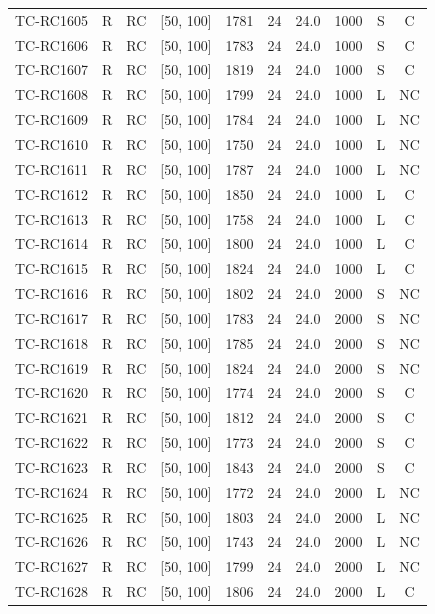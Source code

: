 \begin{longtable}{lccccccccc}
TC-RC1605 & R & RC & [50, 100] & 1781 & 24 & 24.0 & 1000 & S & C \\
TC-RC1606 & R & RC & [50, 100] & 1783 & 24 & 24.0 & 1000 & S & C \\
TC-RC1607 & R & RC & [50, 100] & 1819 & 24 & 24.0 & 1000 & S & C \\
TC-RC1608 & R & RC & [50, 100] & 1799 & 24 & 24.0 & 1000 & L & NC \\
TC-RC1609 & R & RC & [50, 100] & 1784 & 24 & 24.0 & 1000 & L & NC \\
TC-RC1610 & R & RC & [50, 100] & 1750 & 24 & 24.0 & 1000 & L & NC \\
TC-RC1611 & R & RC & [50, 100] & 1787 & 24 & 24.0 & 1000 & L & NC \\
TC-RC1612 & R & RC & [50, 100] & 1850 & 24 & 24.0 & 1000 & L & C \\
TC-RC1613 & R & RC & [50, 100] & 1758 & 24 & 24.0 & 1000 & L & C \\
TC-RC1614 & R & RC & [50, 100] & 1800 & 24 & 24.0 & 1000 & L & C \\
TC-RC1615 & R & RC & [50, 100] & 1824 & 24 & 24.0 & 1000 & L & C \\
TC-RC1616 & R & RC & [50, 100] & 1802 & 24 & 24.0 & 2000 & S & NC \\
TC-RC1617 & R & RC & [50, 100] & 1783 & 24 & 24.0 & 2000 & S & NC \\
TC-RC1618 & R & RC & [50, 100] & 1785 & 24 & 24.0 & 2000 & S & NC \\
TC-RC1619 & R & RC & [50, 100] & 1824 & 24 & 24.0 & 2000 & S & NC \\
TC-RC1620 & R & RC & [50, 100] & 1774 & 24 & 24.0 & 2000 & S & C \\
TC-RC1621 & R & RC & [50, 100] & 1812 & 24 & 24.0 & 2000 & S & C \\
TC-RC1622 & R & RC & [50, 100] & 1773 & 24 & 24.0 & 2000 & S & C \\
TC-RC1623 & R & RC & [50, 100] & 1843 & 24 & 24.0 & 2000 & S & C \\
TC-RC1624 & R & RC & [50, 100] & 1772 & 24 & 24.0 & 2000 & L & NC \\
TC-RC1625 & R & RC & [50, 100] & 1803 & 24 & 24.0 & 2000 & L & NC \\
TC-RC1626 & R & RC & [50, 100] & 1743 & 24 & 24.0 & 2000 & L & NC \\
TC-RC1627 & R & RC & [50, 100] & 1799 & 24 & 24.0 & 2000 & L & NC \\
TC-RC1628 & R & RC & [50, 100] & 1806 & 24 & 24.0 & 2000 & L & C \\

\end{longtable}
